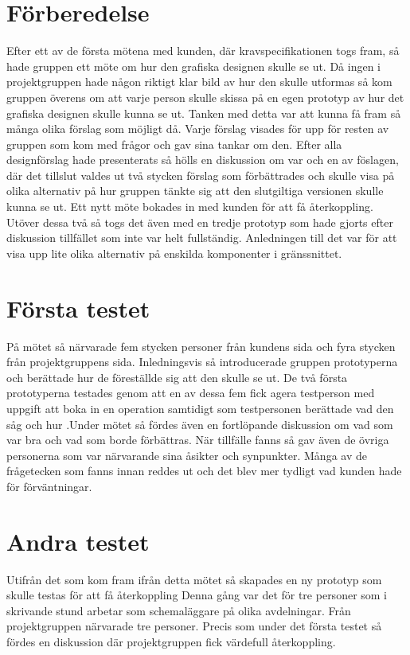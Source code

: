 \section{Förberedelse} 
Efter ett av de första mötena med kunden, där kravspecifikationen togs fram, så hade gruppen ett möte om hur den grafiska designen skulle se ut. Då ingen i projektgruppen hade någon riktigt klar bild av hur den skulle utformas så kom gruppen överens om att varje person skulle skissa på en egen prototyp av hur det grafiska designen skulle kunna se ut. Tanken med detta var att kunna få fram så många olika förslag som möjligt då. Varje förslag visades för upp för resten av gruppen som kom med frågor och gav sina tankar om den. Efter alla designförslag hade presenterats så hölls en diskussion om var och en av föslagen, där det tillslut valdes ut två stycken förslag som förbättrades och skulle visa på olika alternativ på hur gruppen tänkte sig att den slutgiltiga versionen skulle kunna se ut. Ett nytt möte bokades in med kunden för att få återkoppling. Utöver dessa två så togs det även med en tredje prototyp som hade gjorts efter diskussion tillfället som inte var helt fullständig. Anledningen till det var för att visa upp lite olika alternativ på enskilda komponenter i gränssnittet. 

\section{Första testet} 
På mötet så närvarade fem stycken personer från kundens sida och fyra stycken från projektgruppens sida. Inledningsvis så introducerade gruppen prototyperna och berättade hur de föreställde sig att den skulle se ut.  De två första prototyperna testades genom att en av dessa fem fick agera testperson med uppgift att boka in en operation samtidigt som testpersonen berättade vad den såg och hur  .Under mötet så fördes även en fortlöpande diskussion om vad som var bra och vad som borde förbättras. När tillfälle fanns så gav även de övriga personerna som var närvarande sina åsikter och synpunkter. Många av de frågetecken som fanns innan reddes ut och det blev mer tydligt vad kunden hade för förväntningar.  

\section{Andra testet} 
Utifrån det som kom fram ifrån detta mötet så skapades en ny prototyp som skulle testas för att få återkoppling  Denna gång var det för tre personer som i skrivande stund arbetar som schemaläggare på olika avdelningar. Från projektgruppen närvarade tre personer. Precis som under det första testet så fördes en diskussion där projektgruppen fick värdefull återkoppling. 

